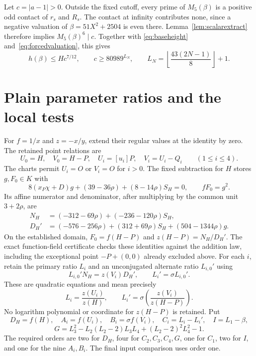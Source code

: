 \documentclass[11pt,a4paper]{article}
\begin{document}
Let $c=|a-1|>0$. Outside the fixed cutoff, every prime of
$M_5(\beta)$ is a positive odd contact of $r_s$ and $R_s$.
The contact at infinity contributes none, since a negative valuation
of $\beta=51X^2+2504$ is even there. Lemma~\ref{lem:scalarextract}
therefore implies $M_5(\beta)^6\mid c$. Together with
\eqref{eq:baseheight} and~\eqref{eq:forcedvaluation}, this gives
\begin{equation}\label{eq:scalar}
 h(\beta)\le Hc^{7/12},\qquad c\ge80989^{L_N},\qquad
 L_N=\left\lfloor\frac{43(2N-1)}8\right\rfloor+1.
\end{equation}

\section{Plain parameter ratios and the local tests}
For $f=1/x$ and $z=-x/y$, extend their regular values at the
identity by zero. The retained point relations are
\[
 U_0=H,\quad V_0=H-P,\quad U_i=[u_i]P,\quad V_i=U_i-Q_i
 \qquad(1\le i\le4).
\]
The charts permit $U_i=O$ or $V_i=O$ for $i>0$.
The fixed subtraction for $H$ stores $g,F_0\in K$ with
\[
 8(x_P\chi+D)g+(39-36\rho)+(8-14\rho)S_H=0,
 \qquad fF_0=g^2.
\]
Its affine numerator and denominator, after multiplying by the
common unit $3+2\rho$, are
\[
 \begin{split}
 N_H&=(-312-69\rho)+(-236-120\rho)S_H,\\
 D_H'&=(-576-256\rho)+(312+69\rho)S_H+(504-1344\rho)g.
 \end{split}
\]
On the established domain, $F_0=f(H-P)$ and $z(H-P)=N_H/D_H'$.
The exact function-field certificate checks these identities against
the addition law, including the exceptional point
$-P+(0,0)$ already excluded above.
For each $i$, retain the primary ratio $L_i$ and an unconjugated
alternate ratio $L_{i,0}'$ using
\[
             L_{i,0}'N_H=z(V_i)D_H',\qquad L_i'=\sigma L_{i,0}'.
\]
These are quadratic equations and mean precisely
\[
       L_i=\frac{z(U_i)}{z(H)},\qquad
       L_i'=\sigma\!\left(\frac{z(V_i)}{z(H-P)}\right).
\]
No logarithm polynomial or coordinate for $z(H-P)$ is retained.
Put
\[
 D_H=f(H),\quad A_i=f(U_i),\quad B_i=\sigma f(V_i),\quad
 C_i=L_i-L_i',\quad I=L_1-\beta,
\]
\[
 G=L_3^2-L_2(L_2-2)L_3L_4+(L_2-2)^2L_4^2-1.
\]
The required orders are two for $D_H$, four for $C_2,C_3,C_4,G$,
one for $C_1$, two for $I$, and one for the nine $A_i,B_i$.
The final input comparison uses order one.
\end{document}
